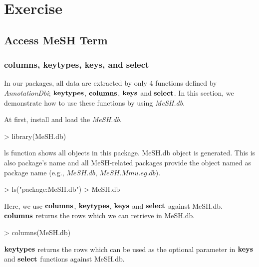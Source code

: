 \documentclass[11pt]{article}
\newcommand{\Rpackage}[1]{{\textit{#1}}}
\begin{document}
\section{Exercise}
\subsection{Access MeSH Term}
\subsubsection{columns, keytypes, keys, and select}
In our packages, all data are extracted by only 4 functions defined by \Rpackage{AnnotationDbi}; $\bf{keytypes}$, $\bf{columns}$, $\bf{keys}$ and $\bf{select}$. In this section, we demonstrate how to use these functions by using \Rpackage{MeSH.db}.

At first, install and load the \Rpackage{MeSH.db}.
\begin{center}
\begin{Schunk}
\begin{Sinput}
> library(MeSH.db)
\end{Sinput}
\end{Schunk}
\end{center}

ls function shows all objects in this package. MeSH.db object is generated. This is also package's name and all MeSH-related packages provide the object named as package name (e.g., $MeSH.db$, $MeSH.Mmu.eg.db$).
\begin{center}
\begin{Schunk}
\begin{Sinput}
> ls("package:MeSH.db")
> MeSH.db
\end{Sinput}
\end{Schunk}
\end{center}

Here, we use $\bf{columns}$, $\bf{keytypes}$, $\bf{keys}$ and $\bf{select}$ against MeSH.db.\\

$\bf{columns}$ returns the rows which we can retrieve in MeSH.db.
\begin{center}
\begin{Schunk}
\begin{Sinput}
> columns(MeSH.db)
\end{Sinput}
\end{Schunk}
\end{center}

$\bf{keytypes}$ returns the rows which can be used as the optional parameter in $\bf{keys}$ and $\bf{select}$ functions against MeSH.db.
\end{document}
